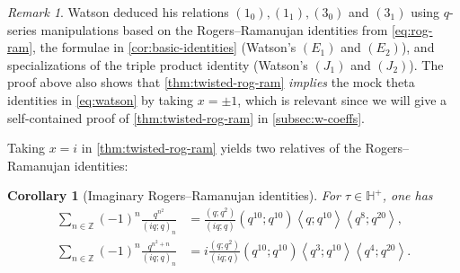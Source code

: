 \documentclass[reqno,11pt]{amsart}
\newtheorem{corollary}[theorem]{Corollary}
\theoremstyle{definition}
\theoremstyle{remark}
\newtheorem*{remark}{Remark}
\numberwithin{equation}{section}
\newcommand{\Z}{\mathbb{Z}}
\renewcommand{\H}{{\mathbb{H}}}
\newcommand{\la}{\left\langle}
\newcommand{\ra}{\right\rangle}
\begin{document}
\begin{remark}
Watson \cite{watson1937mock} deduced his relations $(1_0), (1_1), (3_0)$ and $(3_1)$ using $q$-series manipulations based on the Rogers--Ramanujan identities from \cref{eq:rog-ram}, the formulae in \cref{cor:basic-identities} (Watson's $(E_1)$ and $(E_2)$), and specializations of the triple product identity (Watson's $(J_1)$ and $(J_2)$). The proof above also shows that \cref{thm:twisted-rog-ram} \emph{implies} the mock theta identities in \cref{eq:watson} by taking $x = \pm 1$, which is relevant since we will give a self-contained proof of \cref{thm:twisted-rog-ram} in \cref{subsec:w-coeffs}.
\end{remark}

Taking $x = i$ in \cref{thm:twisted-rog-ram} yields two relatives of the Rogers--Ramanujan identities:

\begin{corollary}[Imaginary Rogers--Ramanujan identities] \label{cor:more-rog-ram}
For $\tau \in \H^+$, one has
\[
\begin{aligned}
    \sum_{n \in \Z} (-1)^n \frac{q^{n^2}}{(iq; q)_n}
    &=
    \frac{\left(q; q^2\right)}{(iq; q)}
    \left(q^{10}; q^{10}\right) \la q; q^{10} \ra \la q^8; q^{20} \ra ,
    \\
    \sum_{n \in \Z} (-1)^n \frac{q^{n^2+n}}{(iq; q)_n}
    &=
    i\frac{\left(q; q^2\right)}{(iq; q)}\left(q^{10}; q^{10}\right) \la q^3; q^{10} \ra \la q^4; q^{20} \ra.
\end{aligned}
\]

\end{corollary}
\end{document}
